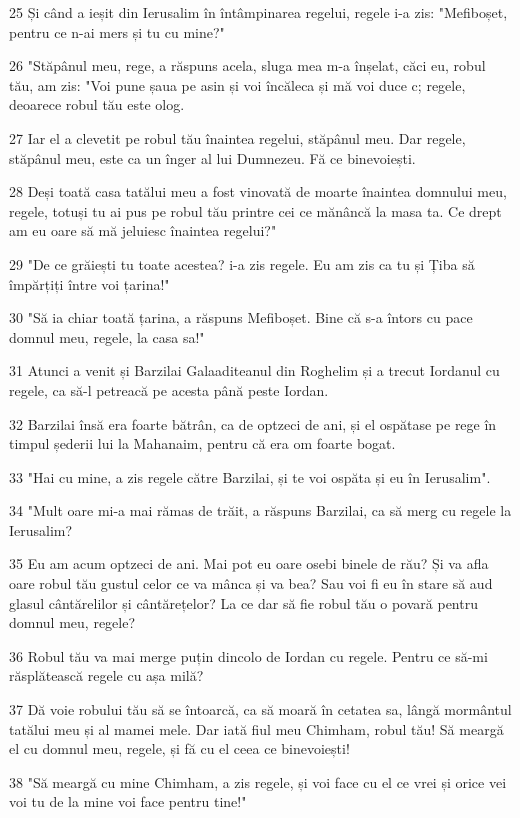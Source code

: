 \par 25 Și când a ieșit din Ierusalim în întâmpinarea regelui, regele i-a zis: "Mefiboșet, pentru ce n-ai mers și tu cu mine?"
\par 26 "Stăpânul meu, rege, a răspuns acela, sluga mea m-a înșelat, căci eu, robul tău, am zis: "Voi pune șaua pe asin și voi încăleca și mă voi duce c; regele, deoarece robul tău este olog.
\par 27 Iar el a clevetit pe robul tău înaintea regelui, stăpânul meu. Dar regele, stăpânul meu, este ca un înger al lui Dumnezeu. Fă ce binevoiești.
\par 28 Deși toată casa tatălui meu a fost vinovată de moarte înaintea domnului meu, regele, totuși tu ai pus pe robul tău printre cei ce mănâncă la masa ta. Ce drept am eu oare să mă jeluiesc înaintea regelui?"
\par 29 "De ce grăiești tu toate acestea? i-a zis regele. Eu am zis ca tu și Țiba să împărțiți între voi țarina!"
\par 30 "Să ia chiar toată țarina, a răspuns Mefiboșet. Bine că s-a întors cu pace domnul meu, regele, la casa sa!"
\par 31 Atunci a venit și Barzilai Galaaditeanul din Roghelim și a trecut Iordanul cu regele, ca să-l petreacă pe acesta până peste Iordan.
\par 32 Barzilai însă era foarte bătrân, ca de optzeci de ani, și el ospătase pe rege în timpul șederii lui la Mahanaim, pentru că era om foarte bogat.
\par 33 "Hai cu mine, a zis regele către Barzilai, și te voi ospăta și eu în Ierusalim".
\par 34 "Mult oare mi-a mai rămas de trăit, a răspuns Barzilai, ca să merg cu regele la Ierusalim?
\par 35 Eu am acum optzeci de ani. Mai pot eu oare osebi binele de rău? Și va afla oare robul tău gustul celor ce va mânca și va bea? Sau voi fi eu în stare să aud glasul cântărelilor și cântărețelor? La ce dar să fie robul tău o povară pentru domnul meu, regele?
\par 36 Robul tău va mai merge puțin dincolo de Iordan cu regele. Pentru ce să-mi răsplătească regele cu așa milă?
\par 37 Dă voie robului tău să se întoarcă, ca să moară în cetatea sa, lângă mormântul tatălui meu și al mamei mele. Dar iată fiul meu Chimham, robul tău! Să meargă el cu domnul meu, regele, și fă cu el ceea ce binevoiești!
\par 38 "Să meargă cu mine Chimham, a zis regele, și voi face cu el ce vrei și orice vei voi tu de la mine voi face pentru tine!"
